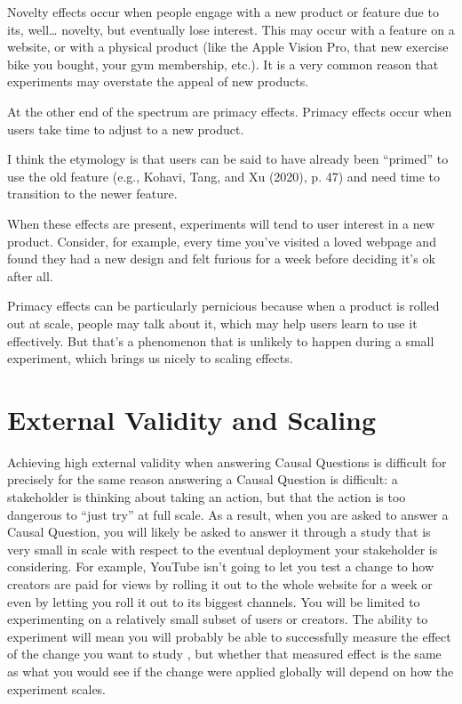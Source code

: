 \documentclass[letterpaper,10pt,english]{jupyterBook}
\begin{document}
\sphinxAtStartPar
Novelty effects occur when people engage with a new product or feature due to its, well… novelty, but eventually lose interest. This may occur with a feature on a website, or with a physical product (like the Apple Vision Pro, that new exercise bike you bought, your gym membership, etc.). It is a very common reason that experiments may overstate the appeal of new products.

\sphinxAtStartPar
At the other end of the spectrum are primacy effects. Primacy effects occur when users take time to adjust to a new product.%
\begin{footnote}[1]\sphinxAtStartFootnote
I think the etymology is that users can be said to have already been “primed” to use the old feature (e.g., Kohavi, Tang, and Xu (2020), p. 47) and need time to transition to the newer feature.
%
\end{footnote} When these effects are present, experiments will tend to  user interest in a new product. Consider, for example, every time you’ve visited a loved webpage and found they had a new design and felt furious for a week before deciding it’s ok after all.

\sphinxAtStartPar
Primacy effects can be particularly pernicious because when a product is rolled out at scale, people may talk about it, which may help users learn to use it effectively. But that’s a phenomenon that is unlikely to happen during a small experiment, which brings us nicely to scaling effects.


\section{External Validity and Scaling}
\label{\detokenize{30_questions/45_causal_questions_external:external-validity-and-scaling}}
\sphinxAtStartPar
Achieving high external validity when answering Causal Questions is difficult for precisely for the same reason answering a Causal Question is difficult: a stakeholder is thinking about taking an action, but that the action is too dangerous to “just try” at full scale. As a result, when you are asked to answer a Causal Question, you will likely be asked to answer it through a study that is very small in scale with respect to the eventual deployment your stakeholder is considering. For example, YouTube isn’t going to let you test a change to how creators are paid for views by rolling it out to the whole website for a week or even by letting you roll it out to its biggest channels. You will be limited to experimenting on a relatively small subset of users or creators. The ability to experiment will mean you will probably be able to successfully measure the effect of the change you want to study , but whether that measured effect is the same as what you would see if the change were applied globally will depend on how the experiment scales.
\end{document}
